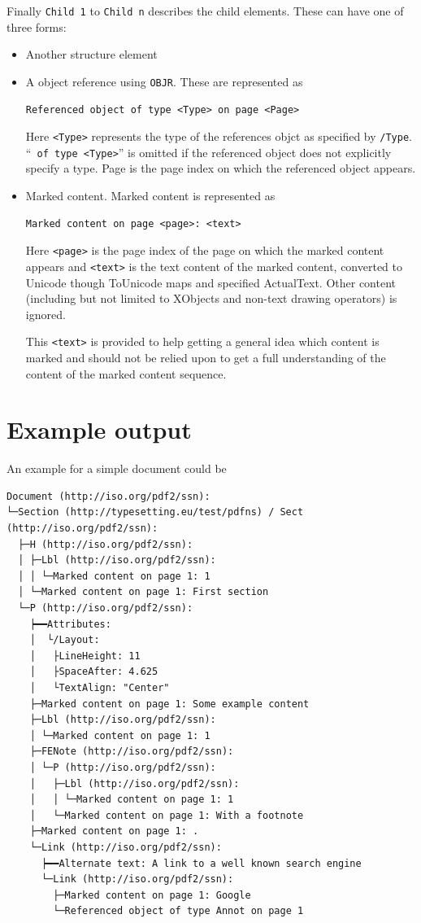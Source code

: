 \documentclass[a4paper]{article}
\begin{document}
Finally \texttt{Child 1} to \texttt{Child n} describes the child elements. These can have one of three forms:
\begin{itemize}
  \item Another structure element
  \item A object reference using \texttt{OBJR}. These are represented as
    \begin{verbatim}
Referenced object of type <Type> on page <Page>
    \end{verbatim}

    Here \texttt{<Type>} represents the type of the references objct as specified by \texttt{/Type}. \enquote{\texttt{ of type <Type>}} is omitted if the referenced object does not explicitly specify a type.
    Page is the page index on which the referenced object appears.
  \item Marked content. Marked content is represented as
    \begin{verbatim}
Marked content on page <page>: <text>
    \end{verbatim}
    Here \texttt{<page>} is the page index of the page on which the marked content appears and \texttt{<text>} is the text content of the marked content, converted to Unicode though ToUnicode maps and specified ActualText. Other content (including but not limited to XObjects and non-text drawing operators) is ignored.

    This \texttt{<text>} is provided to help getting a general idea which content is marked and should not be relied upon to get a full understanding of the content of the marked content sequence.
\end{itemize}

\section{Example output}
An example for a simple document could be
\begin{verbatim}
Document (http://iso.org/pdf2/ssn):
└─Section (http://typesetting.eu/test/pdfns) / Sect (http://iso.org/pdf2/ssn):
  ├─H (http://iso.org/pdf2/ssn):
  │ ├─Lbl (http://iso.org/pdf2/ssn):
  │ │ └─Marked content on page 1: 1
  │ └─Marked content on page 1: First section
  └─P (http://iso.org/pdf2/ssn):
    ┝━━Attributes:
    │  └/Layout:
    │   ├LineHeight: 11
    │   ├SpaceAfter: 4.625
    │   └TextAlign: "Center"
    ├─Marked content on page 1: Some example content
    ├─Lbl (http://iso.org/pdf2/ssn):
    │ └─Marked content on page 1: 1
    ├─FENote (http://iso.org/pdf2/ssn):
    │ └─P (http://iso.org/pdf2/ssn):
    │   ├─Lbl (http://iso.org/pdf2/ssn):
    │   │ └─Marked content on page 1: 1
    │   └─Marked content on page 1: With a footnote
    ├─Marked content on page 1: .
    └─Link (http://iso.org/pdf2/ssn):
      ┝━━Alternate text: A link to a well known search engine
      └─Link (http://iso.org/pdf2/ssn):
        ├─Marked content on page 1: Google
        └─Referenced object of type Annot on page 1
\end{verbatim}
\end{document}
